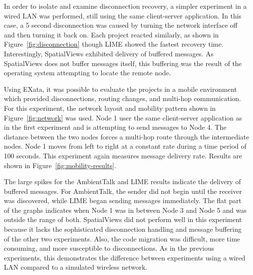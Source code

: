 In order to isolate and examine disconnection recovery, a simpler experiment in a wired LAN was performed, still using the same client-server application. In this case, a 5 second disconnection was caused by turning the network interface off and then turning it back on. Each project reacted similarly, as shown in Figure~\ref{fig:disconnection} though LIME showed the fastest recovery time. Interestingly, SpatialViews exhibited delivery of buffered messages. As SpatialViews does not buffer messages itself, this buffering was the result of the operating system attempting to locate the remote node.

Using EXata, it was possible to evaluate the projects in a mobile environment which provided disconnections, routing changes, and multi-hop communication. For this experiment, the network layout and mobility pattern shown in Figure~\ref{fig:network} was used. Node 1 user the same client-server application as in the first experiment and is attempting to send messages to Node 4. The distance between the two nodes forces a multi-hop route through the intermediate nodes. Node 1 moves from left to right at a constant rate during a time period of 100 seconds. This experiment again measures message delivery rate. Results are shown in Figure~\ref{fig:mobility-results}. 

The large spikes for the AmbientTalk and LIME results indicate the delivery of buffered messages. For AmbientTalk, the sender did not begin until the receiver was discovered, while LIME began sending messages immediately. The flat part of the graphs indicates when Node 1 was in between Node 3 and Node 5 and was outside the range of both. SpatialViews did not perform well in this experiment because it lacks the sophisticated disconnection handling and message buffering of the other two experiments. Also, the code migration was difficult, more time consuming, and more susceptible to disconnections. As in the previous experiments, this demonstrates the difference between experiments using a wired LAN compared to a simulated wireless network. 
